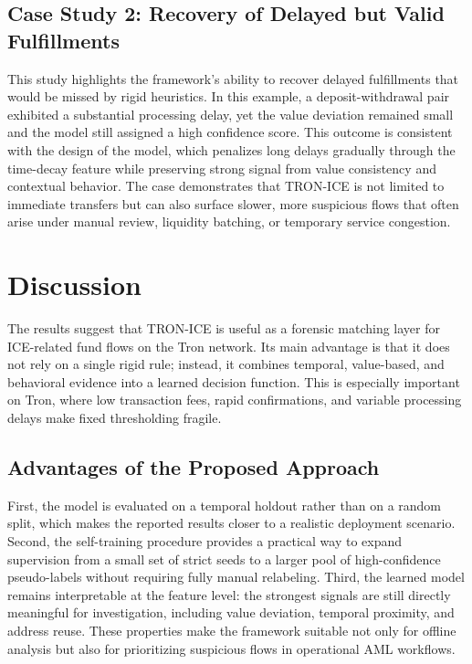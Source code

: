 \documentclass[journal]{IEEEtran}
\begin{document}
    \subsection{Case Study 2: Recovery of Delayed but Valid Fulfillments}
    \label{subsec:case2}
    This study highlights the framework's ability to recover delayed fulfillments that would be missed by rigid heuristics. In this example, a deposit-withdrawal pair exhibited a substantial processing delay, yet the value deviation remained small and the model still assigned a high confidence score. This outcome is consistent with the design of the model, which penalizes long delays gradually through the time-decay feature while preserving strong signal from value consistency and contextual behavior. The case demonstrates that TRON-ICE is not limited to immediate transfers but can also surface slower, more suspicious flows that often arise under manual review, liquidity batching, or temporary service congestion.
    
    \section{Discussion}
    \label{sec:discussion}
    
    The results suggest that TRON-ICE is useful as a forensic matching layer for ICE-related fund flows on the Tron network. Its main advantage is that it does not rely on a single rigid rule; instead, it combines temporal, value-based, and behavioral evidence into a learned decision function. This is especially important on Tron, where low transaction fees, rapid confirmations, and variable processing delays make fixed thresholding fragile.
    
    \subsection{Advantages of the Proposed Approach}
    
    First, the model is evaluated on a temporal holdout rather than on a random split, which makes the reported results closer to a realistic deployment scenario. Second, the self-training procedure provides a practical way to expand supervision from a small set of strict seeds to a larger pool of high-confidence pseudo-labels without requiring fully manual relabeling. Third, the learned model remains interpretable at the feature level: the strongest signals are still directly meaningful for investigation, including value deviation, temporal proximity, and address reuse. These properties make the framework suitable not only for offline analysis but also for prioritizing suspicious flows in operational AML workflows.
    
\end{document}
